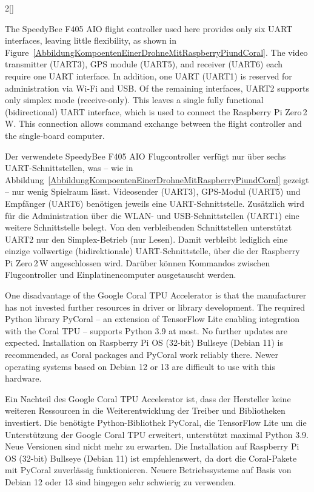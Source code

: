 \begin{paracol}{2}[]
\colstart

The SpeedyBee F405 AIO flight controller used here provides only six UART interfaces, leaving little flexibility, as shown in Figure~\ref{AbbildungKompoentenEinerDrohneMitRaspberryPiundCoral}. The video transmitter (UART3), GPS module (UART5), and receiver (UART6) each require one UART interface. In addition, one UART (UART1) is reserved for administration via Wi-Fi and USB. Of the remaining interfaces, UART2 supports only simplex mode (receive-only). This leaves a single fully functional (bidirectional) UART interface, which is used to connect the Raspberry Pi Zero\,2\,W. This connection allows command exchange between the flight controller and the single-board computer.

\colger

Der verwendete SpeedyBee F405 AIO Flugcontroller verfügt nur über sechs UART-Schnittstellen, was -- wie in Abbildung~\ref{AbbildungKompoentenEinerDrohneMitRaspberryPiundCoral} gezeigt -- nur wenig Spielraum lässt. Videosender (UART3), GPS-Modul (UART5) und Empfänger (UART6) benötigen jeweils eine UART-Schnittstelle. Zusätzlich wird für die Administration über die WLAN- und USB-Schnittstellen (UART1) eine weitere Schnittstelle belegt. Von den verbleibenden Schnittstellen unterstützt UART2 nur den Simplex-Betrieb (nur Lesen). Damit verbleibt lediglich eine einzige vollwertige (bidirektionale) UART-Schnittstelle, über die der Raspberry Pi Zero\,2\,W angeschlossen wird. Darüber können Kommandos zwischen Flugcontroller und Einplatinencomputer ausgetauscht werden.

\coleng

One disadvantage of the Google Coral TPU Accelerator is that the manufacturer has not invested further resources in driver or library development. The required Python library PyCoral -- an extension of TensorFlow Lite enabling integration with the Coral TPU -- supports Python 3.9 at most. No further updates are expected. Installation on Raspberry Pi OS (32-bit) Bullseye (Debian 11) is recommended, as Coral packages and PyCoral work reliably there. Newer operating systems based on Debian 12 or 13 are difficult to use with this hardware.

\colger

Ein Nachteil des Google Coral TPU Accelerator ist, dass der Hersteller keine weiteren Ressourcen in die Weiterentwicklung der Treiber und Bibliotheken investiert. Die benötigte Python-Bibliothek PyCoral, die TensorFlow Lite um die Unterstützung der Google Coral TPU erweitert, unterstützt maximal Python 3.9. Neue Versionen sind nicht mehr zu erwarten. Die Installation auf Raspberry Pi OS (32-bit) Bullseye (Debian 11) ist empfehlenswert, da dort die Coral-Pakete mit PyCoral zuverlässig funktionieren. Neuere Betriebssysteme auf Basis von Debian 12 oder 13 sind hingegen sehr schwierig zu verwenden.


\end{paracol}
